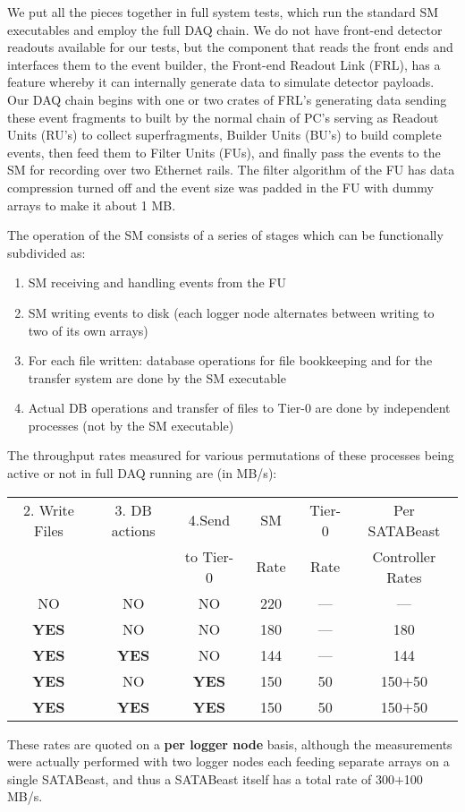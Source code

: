 We put all the pieces together in full system tests, 
which run the standard SM executables and employ the full DAQ chain.
We do not have front-end detector readouts available for our tests, 
but the component that reads the front ends and interfaces them to the event builder,
the Front-end Readout Link (FRL), has a feature whereby it can internally generate
data to simulate detector payloads.
Our DAQ chain begins with  one or two crates of FRL's generating data
sending  these event fragments to built by the normal chain of PC's serving
as Readout Units (RU's) to collect superfragments,
Builder Units (BU's) to build complete events,
then feed them to Filter Units (FUs), and finally
pass the events to the SM for recording over two Ethernet rails.
The filter algorithm of the FU has data  compression turned off and 
the event size was padded in the FU with dummy arrays to make it about 1 MB.

The operation of the SM consists of a series of stages which can be
functionally subdivided as:
\begin{enumerate}
  \item SM receiving and handling events from the FU  
  \item SM writing events to disk (each logger node alternates between writing to two of its own  arrays)
  \item For each file written: database operations for file bookkeeping and for the transfer system 
        are done by the SM executable
  \item Actual DB operations and transfer of files to Tier-0 are done by independent processes
        (not by the SM executable) 

\end{enumerate}
The throughput rates measured for various permutations of these processes being
active or not in full DAQ running  are (in MB/s):
\begin{center}
\begin{tabular}{c|c|c|c|c|c} 
2. Write Files & 3. DB actions & 4.Send   & SM      & Tier-0     & Per SATABeast \\ 
               &               &to Tier-0 &  ~Rate~   &Rate  & Controller Rates \\ \hline
   NO       &   NO       &    NO          &       220      &   --- &   ---       \\
 {\bf YES}  &   NO       &    NO          &       180      &   --- &   180       \\
 {\bf YES}  &  {\bf YES} &    NO          &       144      &   --- &   144       \\
 {\bf YES}  &   NO       &   {\bf YES}    &       150      &    50 &   150$+$50  \\
 {\bf YES}  &  {\bf YES} &   {\bf YES}    &       150      &    50 &   150$+$50  \\
\end{tabular}
\label{tab:rates}
\end{center}
These rates are quoted on  a {\bf per logger node} basis, although the measurements
were actually performed with two logger nodes each feeding separate arrays 
on a single SATABeast, and thus a  SATABeast itself has a total rate of 300$+$100 MB/s.


